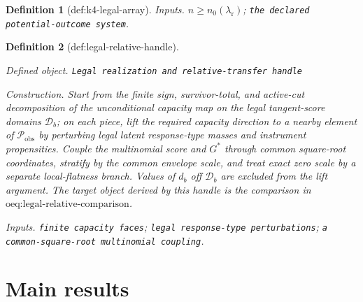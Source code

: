 \documentclass{article}
\newtheorem{definition}{Definition}
\begin{document}
\begin{definition}[def:k4-legal-array]
\par\smallskip\noindent\emph{Inputs.} \(n\ge n_0(\lambda_{\mathrm r})\); \texttt{the declared potential-\allowbreak{}outcome system}.
\end{definition}

\begin{definition}[def:legal-relative-handle]\label{def:legal-relative-handle}
\par\smallskip\noindent\emph{Defined object.} \texttt{Legal realization and relative-\allowbreak{}transfer handle}
\par\smallskip\noindent\emph{Construction.} Start from the finite sign, survivor-total, and active-cut decomposition of the unconditional capacity map on the legal tangent-score domains \(\mathcal D_b\); on each piece, lift the required capacity direction to a nearby element of \(\mathcal P_{\mathrm{obs}}\) by perturbing legal latent response-type masses and instrument propensities. Couple the multinomial score and \(G^*\) through common square-root coordinates, stratify by the common envelope scale, and treat exact zero scale by a separate local-flatness branch. Values of \(d_b\) off \(\mathcal D_b\) are excluded from the lift argument. The target object derived by this handle is the comparison in \(\text{oeq:legal-relative-comparison}\).
\par\smallskip\noindent\emph{Inputs.} \texttt{finite capacity faces}; \texttt{legal response-\allowbreak{}type perturbations}; \texttt{a common-\allowbreak{}square-\allowbreak{}root multinomial coupling}.
\end{definition}

\section{Main results}
\end{document}
